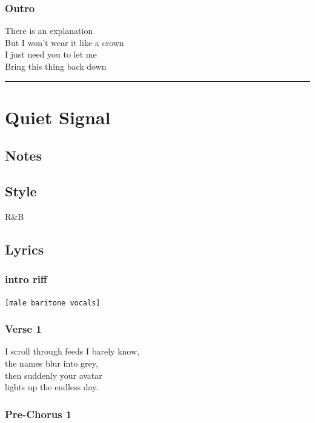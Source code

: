 \subsubsection{Outro}\label{outro-2}

There is an explanation\\
But I won't wear it like a crown\\
I just need you to let me\\
Bring this thing back down

\begin{center}\rule{0.5\linewidth}{0.5pt}\end{center}

\section{Quiet Signal}\label{quiet-signal}

\subsection{Notes}\label{notes-12}

\subsection{Style}\label{style-11}

R\&B

\subsection{Lyrics}\label{lyrics-11}

\subsubsection{intro riff}\label{intro-riff}

\texttt{{[}male\ baritone\ vocals{]}}

\subsubsection{Verse 1}\label{verse-1-4}

I scroll through feeds I barely know,\\
the names blur into grey,\\
then suddenly your avatar\\
lights up the endless day.

\subsubsection{Pre-Chorus 1}\label{pre-chorus-1-1}

